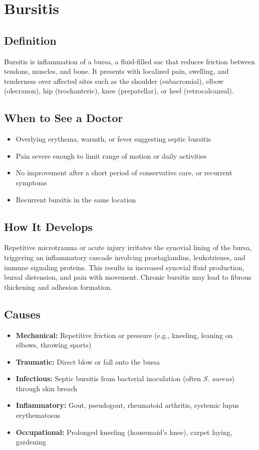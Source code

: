 \chapter{Bursitis}

\section*{Definition}
Bursitis is inflammation of a bursa, a fluid-filled sac that reduces friction between tendons, muscles, and bone. It presents with localized pain, swelling, and tenderness over affected sites such as the shoulder (subacromial), elbow (olecranon), hip (trochanteric), knee (prepatellar), or heel (retrocalcaneal).

\section*{When to See a Doctor}

\begin{itemize}
 \item Overlying erythema, warmth, or fever suggesting septic bursitis
 \item Pain severe enough to limit range of motion or daily activities
 \item No improvement after a short period of conservative care, or recurrent symptoms
 \item Recurrent bursitis in the same location
\end{itemize}

\section*{How It Develops}
Repetitive microtrauma or acute injury irritates the synovial lining of the bursa, triggering an inflammatory cascade involving prostaglandins, leukotrienes, and immune signaling proteins. This results in increased synovial fluid production, bursal distension, and pain with movement. Chronic bursitis may lead to fibrous thickening and adhesion formation.

\section*{Causes}
\begin{itemize}
 \item \textbf{Mechanical:} Repetitive friction or pressure (e.g., kneeling, leaning on elbows, throwing sports)
 \item \textbf{Traumatic:} Direct blow or fall onto the bursa
 \item \textbf{Infectious:} Septic bursitis from bacterial inoculation (often \textit{S. aureus}) through skin breach
 \item \textbf{Inflammatory:} Gout, pseudogout, rheumatoid arthritis, systemic lupus erythematosus
 \item \textbf{Occupational:} Prolonged kneeling (housemaid's knee), carpet laying, gardening
\end{itemize}


